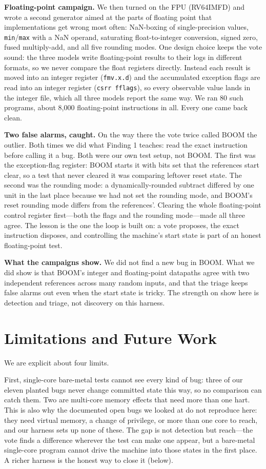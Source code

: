\documentclass[conference]{IEEEtran}
\newcommand{\code}[1]{\texttt{\small #1}}
\begin{document}
\textbf{Floating-point campaign.} We then turned on the FPU (RV64IMFD) and wrote a
second generator aimed at the parts of floating point that implementations get
wrong most often: NaN-boxing of single-precision values, \code{min}/\code{max}
with a NaN operand, saturating float-to-integer conversion, signed zero, fused
multiply-add, and all five rounding modes. One design choice keeps the vote
sound: the three models write floating-point results to their logs in different
formats, so we never compare the float registers directly. Instead each result is
moved into an integer register (\code{fmv.x.d}) and the accumulated exception
flags are read into an integer register (\code{csrr fflags}), so every observable
value lands in the integer file, which all three models report the same way. We
ran 80 such programs, about 8{,}000 floating-point instructions in all. Every one
came back clean.

\textbf{Two false alarms, caught.} On the way there the vote twice called BOOM the
outlier. Both times we did what Finding 1 teaches: read the exact instruction
before calling it a bug. Both were our own test setup, not BOOM. The first was the
exception-flag register: BOOM starts it with bits set that the references start
clear, so a test that never cleared it was comparing leftover reset state. The
second was the rounding mode: a dynamically-rounded subtract differed by one unit
in the last place because we had not set the rounding mode, and BOOM's reset
rounding mode differs from the references'. Clearing the whole floating-point
control register first---both the flags and the rounding mode---made all three
agree. The lesson is the one the loop is built on: a vote proposes, the exact
instruction disposes, and controlling the machine's start state is part of an
honest floating-point test.

\textbf{What the campaigns show.} We did not find a new bug in BOOM. What we did
show is that BOOM's integer and floating-point datapaths agree with two
independent references across many random inputs, and that the triage keeps false
alarms out even when the start state is tricky. The strength on show here is
detection and triage, not discovery on this harness.

\section{Limitations and Future Work}
\label{sec:limitations}
We are explicit about four limits.

First, single-core bare-metal tests cannot see every kind of bug: three of our
eleven planted bugs never change committed state this way, so no comparison can
catch them. Two are multi-core memory effects that need more than one hart. This
is also why the documented open bugs we looked at do not reproduce here: they
need virtual memory, a change of privilege, or more than one core to reach, and
our harness sets up none of these. The gap is not detection but reach---the vote
finds a difference wherever the test can make one appear, but a bare-metal
single-core program cannot drive the machine into those states in the first
place. A richer harness is the honest way to close it (below).
\end{document}
